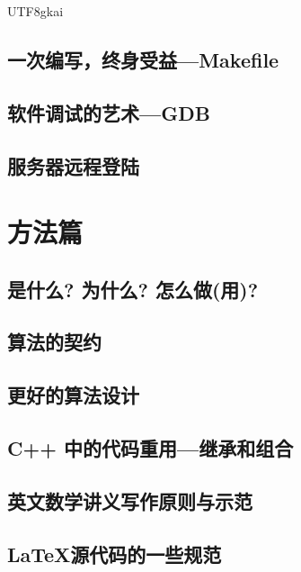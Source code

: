 \documentclass[a4paper,oneside]{report}
\begin{document}
\begin{CJK*}{UTF8}{gkai}
\section{一次编写，终身受益---Makefile}
\label{sec:make}


\section{软件调试的艺术---GDB}
\label{sec:gdb}


\section{服务器远程登陆}
\label{sec:ssh}



\chapter{方法篇}

\section{是什么? 为什么? 怎么做(用)?}
\label{sec:WhatWhyHow}


\section{算法的契约}
\label{sec:contract}


\section{更好的算法设计}
\label{sec:designAlgo}


\section{C++ 中的代码重用---继承和组合}
\label{sec:reuse}


\section{英文数学讲义写作原则与示范}
\label{sec:writeNotes}


\section{\LaTeX 源代码的一些规范}
\label{sec:writeTexfiles}

{\footnotesize


}



\end{CJK*}
\end{document}
